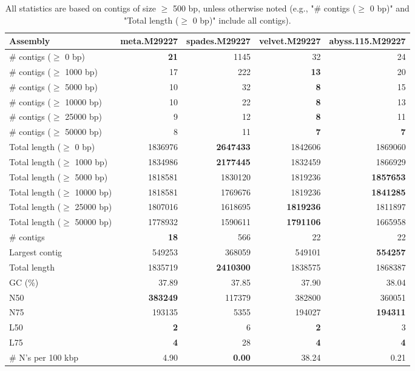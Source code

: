 \documentclass[12pt,a4paper]{article}
\begin{document}
\begin{table}[ht]
\begin{center}
\caption{All statistics are based on contigs of size $\geq$ 500 bp, unless otherwise noted (e.g., "\# contigs ($\geq$ 0 bp)" and "Total length ($\geq$ 0 bp)" include all contigs).}
\begin{tabular}{|l*{4}{|r}|}
\hline
Assembly & meta.M29227 & spades.M29227 & velvet.M29227 & abyss.115.M29227 \\ \hline
\# contigs ($\geq$ 0 bp) & {\bf 21} & 1145 & 32 & 24 \\ \hline
\# contigs ($\geq$ 1000 bp) & 17 & 222 & {\bf 13} & 20 \\ \hline
\# contigs ($\geq$ 5000 bp) & 10 & 32 & {\bf 8} & 15 \\ \hline
\# contigs ($\geq$ 10000 bp) & 10 & 22 & {\bf 8} & 13 \\ \hline
\# contigs ($\geq$ 25000 bp) & 9 & 12 & {\bf 8} & 11 \\ \hline
\# contigs ($\geq$ 50000 bp) & 8 & 11 & {\bf 7} & {\bf 7} \\ \hline
Total length ($\geq$ 0 bp) & 1836976 & {\bf 2647433} & 1842606 & 1869060 \\ \hline
Total length ($\geq$ 1000 bp) & 1834986 & {\bf 2177445} & 1832459 & 1866929 \\ \hline
Total length ($\geq$ 5000 bp) & 1818581 & 1830120 & 1819236 & {\bf 1857653} \\ \hline
Total length ($\geq$ 10000 bp) & 1818581 & 1769676 & 1819236 & {\bf 1841285} \\ \hline
Total length ($\geq$ 25000 bp) & 1807016 & 1618695 & {\bf 1819236} & 1811897 \\ \hline
Total length ($\geq$ 50000 bp) & 1778932 & 1590611 & {\bf 1791106} & 1665958 \\ \hline
\# contigs & {\bf 18} & 566 & 22 & 22 \\ \hline
Largest contig & 549253 & 368059 & 549101 & {\bf 554257} \\ \hline
Total length & 1835719 & {\bf 2410300} & 1838575 & 1868387 \\ \hline
GC (\%) & 37.89 & 37.85 & 37.90 & 38.04 \\ \hline
N50 & {\bf 383249} & 117379 & 382800 & 360051 \\ \hline
N75 & 193135 & 5355 & 194027 & {\bf 194311} \\ \hline
L50 & {\bf 2} & 6 & {\bf 2} & 3 \\ \hline
L75 & {\bf 4} & 28 & {\bf 4} & {\bf 4} \\ \hline
\# N's per 100 kbp & 4.90 & {\bf 0.00} & 38.24 & 0.21 \\ \hline
\end{tabular}
\end{center}
\end{table}
\end{document}
